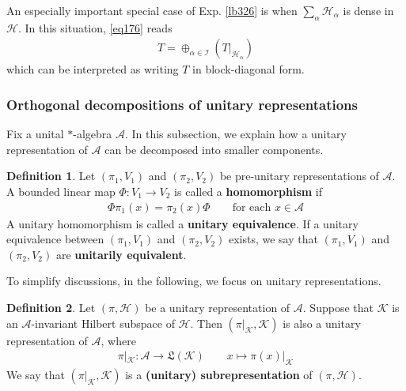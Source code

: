\documentclass[12pt,b5paper,notitlepage]{article}
\theoremstyle{definition}
\newtheorem{df}{Definition}[subsection]
\theoremstyle{plain}
\newcommand{\fk}{\mathfrak}
\newcommand{\scr}{\mathscr}
\newcommand{\MH}{\mathcal H}
\newcommand{\MK}{\mathcal K}
\newcommand{\SI}{\mathscr I}
\newcommand{\SA}{\mathscr A}
\numberwithin{equation}{section}
\begin{document}
An especially important special case of Exp. \ref{lb326} is when $\sum_\alpha\MH_\alpha$ is dense in $\MH$. In this situation, \eqref{eq176} reads
\begin{align*}
T=\oplus_{\alpha\in\SI}(T|_{\MH_\alpha})
\end{align*}
which can be interpreted as writing $T$ in block-diagonal form.



\subsubsection{Orthogonal decompositions of unitary representations}



Fix a unital $*$-algebra $\SA$. In this subsection, we explain how a unitary representation of $\SA$ can be decomposed into smaller components. 


\begin{df}
Let $(\pi_1,V_1)$ and $(\pi_2,V_2)$ be pre-unitary representations of $\SA$. A bounded linear map $\Phi:V_1\rightarrow V_2$ is called a \textbf{homomorphism}  if 
\begin{align*}
\Phi\pi_1(x)=\pi_2(x)\Phi\qquad\text{for each }x\in\SA
\end{align*}
A unitary homomorphism is called a \textbf{unitary equivalence}.  If a unitary equivalence between $(\pi_1,V_1)$ and $(\pi_2,V_2)$ exists, we say that $(\pi_1,V_1)$ and $(\pi_2,V_2)$ are \textbf{unitarily equivalent}.
\end{df}


To simplify discussions, in the following, we focus on unitary representations.


\begin{df}
Let $(\pi,\MH)$ be a unitary representation of $\SA$. Suppose that $\MK$ is an $\scr A$-invariant Hilbert subspace of $\MH$. Then $(\pi|_\MK,\MK)$ is also a unitary representation of $\SA$, where
\begin{align*}
\pi|_\MK:\SA\rightarrow\fk L(\MK)\qquad x\mapsto \pi(x)|_\MK
\end{align*}
We say that $(\pi|_\MK,\MK)$ is a \textbf{(unitary) subrepresentation}  of $(\pi,\MH)$.
\end{df}
\end{document}
